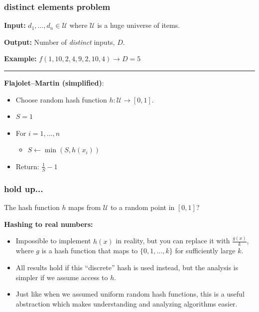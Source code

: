 \documentclass[handout,compress]{beamer}
\begin{document}
\begin{frame}
	\frametitle{distinct elements problem}
\textbf{Input:} $d_1, \ldots, d_n \in \mathcal{U}$ where $\mathcal{U}$ is a huge universe of items. 

	\textbf{Output:} Number of \emph{distinct} inputs, $D$.

\textbf{Example:} $f(1, 10, 2, 4, 9, 2, 10, 4) \rightarrow D = 5$

\vspace{.5em}
\hrule
\vspace{.5em}

\textbf{Flajolet–Martin (simplified)}:
\begin{itemize}
	\item Choose random hash function $h: \mathcal{U} \rightarrow [0,1]$.
	\item $S = 1$ 
	\item For $i = 1, \ldots, n$
	\begin{itemize}
		\item $S \leftarrow \min(S, h(x_i))$
	\end{itemize} 
	\item Return: $\frac{1}{S} - 1$
\end{itemize}
\end{frame}

\begin{frame}
	\frametitle{hold up...}
	\begin{center}
	The hash function $h$ maps from $\mathcal{U}$ to a random point in $[0,1]$?
	\end{center}

	\textbf{Hashing to real numbers:}
	\begin{itemize}
		\item Impossible to implement $h(x)$ in reality, but you can replace it with $\frac{g(x)}{k}$, where $g$ is a hash function that maps to $\{0,1,\ldots,k\}$ for sufficiently large $k$.
		\item All results hold if this ``discrete'' hash is used instead, but the analysis is simpler if we assume access to $h$.
		\item Just like when we assumed uniform random hash functions, this is a useful abstraction which makes understanding and analyzing algorithms easier. 
	\end{itemize}
\end{frame}
\end{document}
